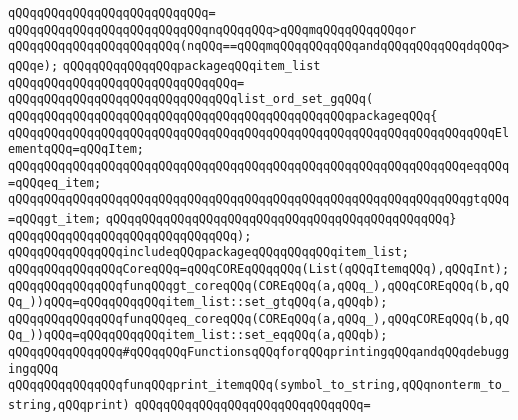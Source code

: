 \verb|qQQqqQQqqQQqqQQqqQQqqQQqqQQq=|\newline
\verb|qQQqqQQqqQQqqQQqqQQqqQQqqQQqnqQQqqQQq>qQQqmqQQqqQQqqQQqor|\newline
\verb|qQQqqQQqqQQqqQQqqQQqqQQq(nqQQq==qQQqmqQQqqQQqqQQqandqQQqqQQqqQQqdqQQq>qQQqe);|\newline
\newline
\verb|qQQqqQQqqQQqqQQqpackageqQQqitem_list|\newline
\verb|qQQqqQQqqQQqqQQqqQQqqQQqqQQqqQQq=|\newline
\verb|qQQqqQQqqQQqqQQqqQQqqQQqqQQqqQQqlist_ord_set_gqQQq(|\newline
\verb|qQQqqQQqqQQqqQQqqQQqqQQqqQQqqQQqqQQqqQQqqQQqqQQqpackageqQQq{|\newline
\verb|qQQqqQQqqQQqqQQqqQQqqQQqqQQqqQQqqQQqqQQqqQQqqQQqqQQqqQQqqQQqqQQqqQQqElementqQQq=qQQqItem;|\newline
\newline
\verb|qQQqqQQqqQQqqQQqqQQqqQQqqQQqqQQqqQQqqQQqqQQqqQQqqQQqqQQqqQQqqQQqeqqQQq=qQQqeq_item;|\newline
\verb|qQQqqQQqqQQqqQQqqQQqqQQqqQQqqQQqqQQqqQQqqQQqqQQqqQQqqQQqqQQqqQQqgtqQQq=qQQqgt_item;|\newline
\verb|qQQqqQQqqQQqqQQqqQQqqQQqqQQqqQQqqQQqqQQqqQQqqQQq}|\newline
\verb|qQQqqQQqqQQqqQQqqQQqqQQqqQQqqQQq);|\newline
\newline
\verb|qQQqqQQqqQQqqQQqincludeqQQqpackageqQQqqQQqqQQqitem_list;|\newline
\newline
\verb|qQQqqQQqqQQqqQQqCoreqQQq=qQQqCOREqQQqqQQq(List(qQQqItemqQQq),qQQqInt);|\newline
\newline
\verb|qQQqqQQqqQQqqQQqfunqQQqgt_coreqQQq(COREqQQq(a,qQQq_),qQQqCOREqQQq(b,qQQq_))qQQq=qQQqqQQqqQQqitem_list::set_gtqQQq(a,qQQqb);|\newline
\verb|qQQqqQQqqQQqqQQqfunqQQqeq_coreqQQq(COREqQQq(a,qQQq_),qQQqCOREqQQq(b,qQQq_))qQQq=qQQqqQQqqQQqitem_list::set_eqqQQq(a,qQQqb);|\newline
\newline
\verb|qQQqqQQqqQQqqQQq#qQQqqQQqFunctionsqQQqforqQQqprintingqQQqandqQQqdebuggingqQQq|\newline
\newline
\verb|qQQqqQQqqQQqqQQqfunqQQqprint_itemqQQq(symbol_to_string,qQQqnonterm_to_string,qQQqprint)|\newline
\verb|qQQqqQQqqQQqqQQqqQQqqQQqqQQqqQQq=|\newline
